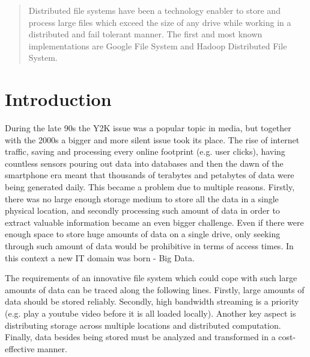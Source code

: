 \documentclass{sig-alternate}
\begin{document}

\maketitle
\begin{abstract}
Distributed file systems have been a technology enabler to store and process large files which exceed the size of any drive while working in a distributed and fail tolerant manner. The first and most known implementations are Google File System and Hadoop Distributed File System.
\end{abstract}




\section{Introduction}
During the late 90s the Y2K issue was a popular topic in media, but together with the 2000s a bigger and more silent issue took its place. 
The rise of internet traffic, saving and processing every online footprint (e.g. user clicks), having countless sensors pouring out data into databases and then the dawn of the smartphone era meant that thousands of terabytes and petabytes of data were being generated daily. 
This became a problem due to multiple reasons. Firstly, there was no large enough storage medium to store all the data in a single physical location, and secondly processing such amount of data in order to extract valuable information became an even bigger challenge. Even if there were enough space to store huge amounts of data on a single drive, only seeking through such amount of data would be prohibitive in terms of access times. In this context a new IT domain was born - Big Data. 

The requirements of an innovative file system which could cope with such large amounts of data can be traced along the following lines.
Firstly, large amounts of data should be stored reliably. 
Secondly, high bandwidth streaming is a priority (e.g. play a youtube video before it is all loaded locally).
Another key aspect is distributing storage across multiple locations
and distributed computation.
Finally, data besides being stored must be analyzed and transformed in a cost-effective manner.
\end{document}
